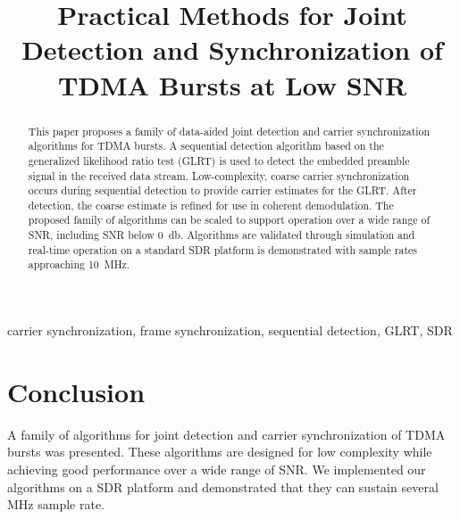\documentclass[10pt,final,conference,comsoc]{IEEEtran}
\begin{document}
\title{Practical Methods for Joint Detection and Synchronization of
  TDMA Bursts at Low SNR}
\author{
}

\maketitle

\begin{abstract}
This paper proposes a family of data-aided joint detection and carrier synchronization algorithms for 
TDMA bursts.
A sequential detection algorithm based on the generalized likelihood ratio test (GLRT)
is used to detect the embedded preamble signal in the received data
stream.
Low-complexity, coarse carrier synchronization 
occurs during sequential detection to provide carrier estimates for
the GLRT.\@
After detection,
the coarse estimate is refined for use in coherent demodulation.
The proposed family of algorithms can be scaled to support operation
over a wide range of SNR, including SNR below \SI{0}{\decibel}.
Algorithms are validated through simulation and real-time operation on
a standard SDR platform is demonstrated with sample rates approaching
\SI{10}{\mega\hertz}.

\end{abstract}

\begin{IEEEkeywords}
carrier synchronization, frame synchronization, sequential
detection, GLRT, SDR
\end{IEEEkeywords}













\section{Conclusion}

A family of algorithms for joint detection and carrier synchronization
of TDMA bursts was presented.
These algorithms are designed for low complexity while achieving good
performance over a wide range of SNR.\@
We implemented our algorithms on a SDR platform and demonstrated that
they can sustain several \si{\mega\hertz} sample rate.



\end{document}
